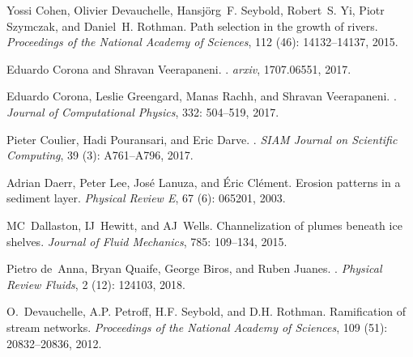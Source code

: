 \documentclass[preprint, 10pt]{elsarticle}
\begin{document}
\begin{thebibliography}{72}
Yossi Cohen, Olivier Devauchelle, Hansj{\"o}rg~F. Seybold, Robert~S. Yi, Piotr
  Szymczak, and Daniel~H. Rothman.
\newblock Path selection in the growth of rivers.
\newblock \emph{Proceedings of the National Academy of Sciences}, 112
  (46): 14132--14137, 2015.

Eduardo Corona and Shravan Veerapaneni.
.
\newblock \emph{arxiv}, 1707.06551, 2017.

Eduardo Corona, Leslie Greengard, Manas Rachh, and Shravan Veerapaneni.
.
\newblock \emph{Journal of Computational Physics}, 332: 504--519,
  2017.

Pieter Coulier, Hadi Pouransari, and Eric Darve.
.
\newblock \emph{SIAM Journal on Scientific Computing}, 39
  (3): A761--A796, 2017.

Adrian Daerr, Peter Lee, Jos{\'e} Lanuza, and {\'E}ric Cl{\'e}ment.
\newblock Erosion patterns in a sediment layer.
\newblock \emph{Physical Review E}, 67 (6): 065201, 2003.

MC~Dallaston, IJ~Hewitt, and AJ~Wells.
\newblock Channelization of plumes beneath ice shelves.
\newblock \emph{Journal of Fluid Mechanics}, 785: 109--134, 2015.

Pietro de~Anna, Bryan Quaife, George Biros, and Ruben Juanes.
.
\newblock \emph{Physical Review Fluids}, 2 (12): 124103,
  2018.

O.~Devauchelle, A.P. Petroff, H.F. Seybold, and D.H. Rothman.
\newblock Ramification of stream networks.
\newblock \emph{Proceedings of the National Academy of Sciences}, 109
  (51): 20832--20836, 2012.


\end{thebibliography}
\end{document}
